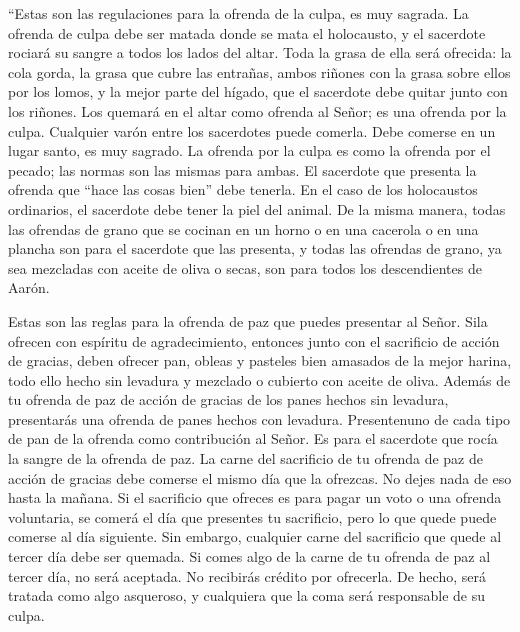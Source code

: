  ``Estas son las regulaciones para la ofrenda de la culpa,
es muy sagrada.  La ofrenda de culpa debe ser matada donde
se mata el holocausto, y el sacerdote rociará su sangre a todos los
lados del altar.  Toda la grasa de ella será ofrecida: la
cola gorda, la grasa que cubre las entrañas,  ambos riñones
con la grasa sobre ellos por los lomos, y la mejor parte del hígado, que
el sacerdote debe quitar junto con los riñones.  Los quemará
en el altar como ofrenda al Señor; es una ofrenda por la culpa.
 Cualquier varón entre los sacerdotes puede comerla. Debe
comerse en un lugar santo, es muy sagrado.  La ofrenda por
la culpa es como la ofrenda por el pecado; las normas son las mismas
para ambas. El sacerdote que presenta la ofrenda que ``hace las cosas
bien'' debe tenerla.  En el caso de los holocaustos
ordinarios, el sacerdote debe tener la piel del animal.  De
la misma manera, todas las ofrendas de grano que se cocinan en un horno
o en una cacerola o en una plancha son para el sacerdote que las
presenta,  y todas las ofrendas de grano, ya sea mezcladas
con aceite de oliva o secas, son para todos los descendientes de Aarón.

 Estas son las reglas para la ofrenda de paz que puedes
presentar al Señor.  Sila ofrecen con espíritu de
agradecimiento, entonces junto con el sacrificio de acción de gracias,
deben ofrecer pan, obleas y pasteles bien amasados de la mejor harina,
todo ello hecho sin levadura y mezclado o cubierto con aceite de oliva.
 Además de tu ofrenda de paz de acción de gracias de los
panes hechos sin levadura, presentarás una ofrenda de panes hechos con
levadura.  Presentenuno de cada tipo de pan de la ofrenda
como contribución al Señor. Es para el sacerdote que rocía la sangre de
la ofrenda de paz.  La carne del sacrificio de tu ofrenda
de paz de acción de gracias debe comerse el mismo día que la ofrezcas.
No dejes nada de eso hasta la mañana.  Si el sacrificio que
ofreces es para pagar un voto o una ofrenda voluntaria, se comerá el día
que presentes tu sacrificio, pero lo que quede puede comerse al día
siguiente.  Sin embargo, cualquier carne del sacrificio que
quede al tercer día debe ser quemada.  Si comes algo de la
carne de tu ofrenda de paz al tercer día, no será aceptada. No recibirás
crédito por ofrecerla. De hecho, será tratada como algo asqueroso, y
cualquiera que la coma será responsable de su culpa.

